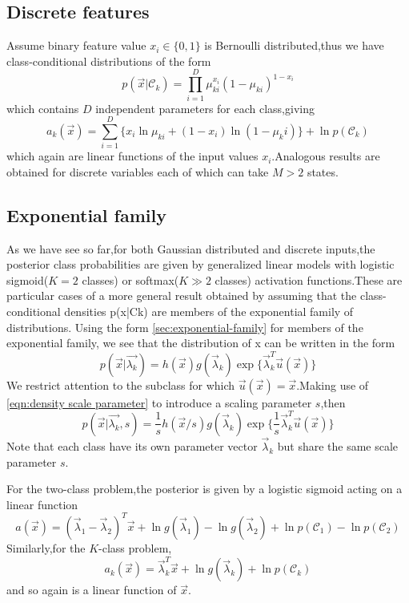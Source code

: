 \subsection{Discrete features}
Assume binary feature value $x_i\in \{0,1\}$ is Bernoulli distributed,thus we have class-conditional distributions of the form
\begin{equation}
p(\vec{x}|\mathcal{C}_k) = \prod_{i=1}^{D}\mu_{ki}^{x_i}(1-\mu_{ki})^{1-x_i}
\end{equation}
which contains $D$ independent parameters for each class,giving
\begin{equation}
a_k(\vec{x}) = \sum_{i=1}^{D}\{x_i\ln\mu_{ki}+(1-x_i)\ln(1-\mu_ki)\} + \ln p(\mathcal{C}_k)
\end{equation}
which again are linear functions of the input values $x_i$.Analogous results are obtained for discrete variables each of which can take $M>2$ states.

\subsection{Exponential family}
As we have see so far,for both Gaussian distributed and discrete inputs,the posterior class probabilities are given by generalized linear models with logistic sigmoid($K=2$ classes) or softmax($K\gg 2$ classes) activation functions.These are particular cases
of a more general result obtained by assuming that the class-conditional densities
p(x|Ck) are members of the exponential family of distributions.
Using the form  \ref{sec:exponential-family} for members of the exponential family, we see that the distribution of x can be written in the form
\begin{equation}
p(\vec{x}|\vec{\lambda_k}) = h(\vec{x})g(\vec{\lambda}_k)
\exp\{\vec{\lambda}_k^T\vec{u}(\vec{x}) \}
\end{equation}
We restrict attention to the subclass for which $\vec{u}(\vec{x})  = \vec{x}$.Making use of \ref{eqn:density scale parameter} to introduce a scaling parameter $s$,then
\begin{equation}
p(\vec{x}|\vec{\lambda_k},s) = \dfrac{1}{s}h(\vec{x}/s)g(\vec{\lambda}_k)
\exp\{\dfrac{1}{s}\vec{\lambda}_k^T\vec{u}(\vec{x}) \}
\end{equation}
Note that each class have its own parameter vector $\vec{\lambda}_k$ but share the same scale parameter $s$.

For the two-class problem,the posterior is given by a logistic sigmoid acting on a linear function
\begin{equation}
a(\vec{x}) = (\vec{\lambda}_1-\vec{\lambda}_2)^T\vec{x} + \ln g(\vec{\lambda}_1) - \ln g(\vec{\lambda}_2) +\ln p(\mathcal{C}_1)-\ln p(\mathcal{C}_2)
\end{equation}
Similarly,for the $K$-class problem,
\begin{equation}
a_k(\vec{x}) = \vec{\lambda}_k^T\vec{x}+\ln g(\vec{\lambda}_k)+\ln p(\mathcal{C}_k)
\end{equation}
and so again is a linear function of $\vec{x}$.

